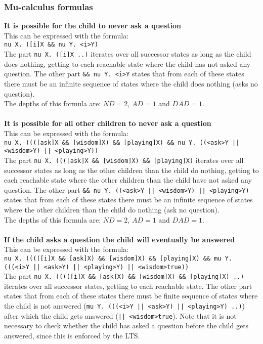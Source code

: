 \documentclass[10pt,a4paper]{article}
\begin{document}
\subsubsection{Mu-calculus formulas}
\textbf{It is possible for the child to never ask a question}\\
This can be expressed with the formula:\\
{\tt nu X. ([i]X \&\& nu Y. <i>Y)}\\
The part {\tt nu X. ([i]X ..)} iterates over all successor states as long as the child does nothing, getting to each reachable state where the child has not asked any question. The other part {\tt \&\& nu Y. <i>Y} states that from each of these states there must be an infinite sequence of states where the child does nothing (asks no question).\\
The depths of this formula are: $ND = 2$, $AD = 1$ and $DAD = 1$.
\\\\
\textbf{It is possible for all other children to never ask a question}\\
This can be expressed with the formula:\\
{\tt nu X. ((([ask]X \&\& [wisdom]X) \&\& [playing]X) \&\& nu Y. ((<ask>Y || <wisdom>Y) || <playing>Y))}\\
The part {\tt nu X. ((([ask]X \&\& [wisdom]X) \&\& [playing]X)} iterates over all successor states as long as the other children than the child do nothing, getting to each reachable state where the other children than the child have not asked any question. The other part {\tt \&\& nu Y. ((<ask>Y || <wisdom>Y) || <playing>Y)} states that from each of these states there must be an infinite sequence of states where the other children than the child do nothing (ask no question).\\ 
The depths of this formula are: $ND = 2$, $AD = 1$ and $DAD = 1$.
\\\\
\textbf{If the child asks a question the child will eventually be answered}\\
This can be expressed with the formula:\\
{\tt nu X. (((([i]X \&\& [ask]X) \&\& [wisdom]X) \&\& [playing]X) \&\& mu Y. (((<i>Y || <ask>Y) || <playing>Y) || <wisdom>true))}\\
The part {\tt nu X. (((([i]X \&\& [ask]X) \&\& [wisdom]X) \&\& [playing]X) ..)} iterates over all successor states, getting to each reachable state. The other part states that from each of these states there must be finite sequence of states where the child is not answered ({\tt mu Y. (((<i>Y || <ask>Y) || <playing>Y) ..)}) after which the child gets answered ({\tt  || <wisdom>true}). Note that it is not necessary to check whether the child has asked a question before the child gets answered, since this is enforced by the LTS.\\
\end{document}
